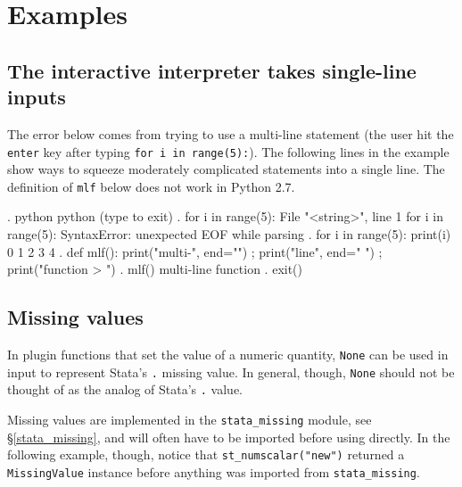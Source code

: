 \documentclass{article}
\begin{document}
	
\section{Examples} \label{examples}
	
\subsection{The interactive interpreter takes single-line inputs} \label{single_line_example}

The error below comes from trying to use a multi-line statement (the user hit the \lstinline$enter$ key after typing \lstinline$for i in range(5):$). The following lines in the example show ways to squeeze moderately complicated statements into a single line. The definition of \lstinline$mlf$ below does not work in Python 2.7.

\begin{stlog}
{\smallskip}
. python
 python (type {} to exit) 
. for i in range(5):
{\color{red}  File "<string>", line 1
    for i in range(5):
                     {\caret}
SyntaxError: unexpected EOF while parsing}
{\smallskip}
. for i in range(5): print(i)
0
1
2
3
4
{\smallskip}
. def mlf(): print("multi-", end="") ; print("line", end=" ") ; print("function
> ")
{\smallskip}
. mlf()
multi-line function
{\smallskip}
. exit()
\end{stlog}


\subsection{Missing values} \label{missing_value_example}

In plugin functions that set the value of a numeric quantity, \lstinline$None$ can be used in input to represent Stata's \lstinline$.$ missing value. In general, though, \lstinline$None$ should not be thought of as the analog of Stata's \lstinline{.} value.

Missing values are implemented in the \lstinline$stata_missing$ module, see \S\ref{stata_missing}, and will often have to be imported before using directly. In the following example, though, notice that \lstinline{st_numscalar("new")} returned a \lstinline{MissingValue} instance before anything was imported from \lstinline{stata_missing}.
\end{document}
